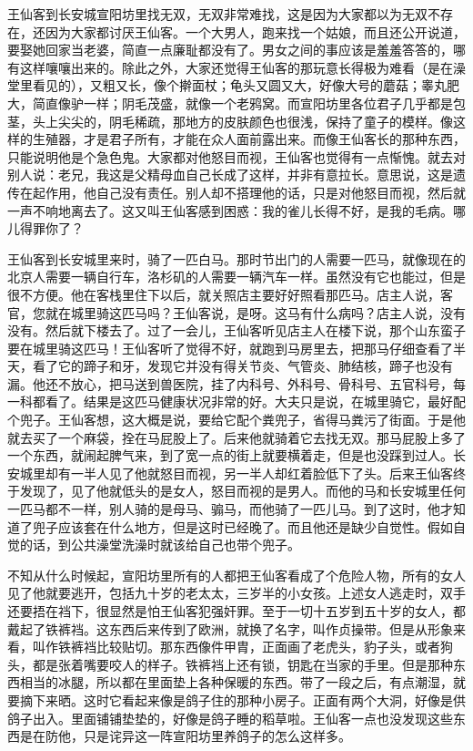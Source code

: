 王仙客到长安城宣阳坊里找无双，无双非常难找，这是因为大家都以为无双不存在，还因为大家都讨厌王仙客。一个大男人，跑来找一个姑娘，而且还公开说道，要娶她回家当老婆，简直一点廉耻都没有了。男女之间的事应该是羞羞答答的，哪有这样嚷嚷出来的。除此之外，大家还觉得王仙客的那玩意长得极为难看（是在澡堂里看见的），又粗又长，像个擀面杖；龟头又圆又大，好像大号的蘑菇；睾丸肥大，简直像驴一样；阴毛茂盛，就像一个老鸦窝。而宣阳坊里各位君子几乎都是包茎，头上尖尖的，阴毛稀疏，那地方的皮肤颜色也很浅，保持了童子的模样。像这样的生殖器，才是君子所有，才能在众人面前露出来。而像王仙客长的那种东西，只能说明他是个急色鬼。大家都对他怒目而视，王仙客也觉得有一点惭愧。就去对别人说：老兄，我这是父精母血自己长成了这样，并非有意拉长。意思说，这是遗传在起作用，他自己没有责任。别人却不搭理他的话，只是对他怒目而视，然后就一声不响地离去了。这又叫王仙客感到困惑：我的雀儿长得不好，是我的毛病。哪儿得罪你了？ 

王仙客到长安城里来时，骑了一匹白马。那时节出门的人需要一匹马，就像现在的北京人需要一辆自行车，洛杉矶的人需要一辆汽车一样。虽然没有它也能过，但是很不方便。他在客栈里住下以后，就关照店主要好好照看那匹马。店主人说，客官，您就在城里骑这匹马吗？王仙客说，是呀。这马有什么病吗？店主人说，没有没有。然后就下楼去了。过了一会儿，王仙客听见店主人在楼下说，那个山东蛮子要在城里骑这匹马！王仙客听了觉得不好，就跑到马房里去，把那马仔细查看了半天，看了它的蹄子和牙，发现它并没有得关节炎、气管炎、肺结核，蹄子也没有漏。他还不放心，把马送到兽医院，挂了内科号、外科号、骨科号、五官科号，每一科都看了。结果是这匹马健康状况非常的好。大夫只是说，在城里骑它，最好配个兜子。王仙客想，这大概是说，要给它配个粪兜子，省得马粪污了街面。于是他就去买了一个麻袋，拴在马屁股上了。后来他就骑着它去找无双。那马屁股上多了一个东西，就闹起脾气来，到了宽一点的街上就要横着走，但是也没踩到过人。长安城里却有一半人见了他就怒目而视，另一半人却红着脸低下了头。后来王仙客终于发现了，见了他就低头的是女人，怒目而视的是男人。而他的马和长安城里任何一匹马都不一样，别人骑的是母马、骟马，而他骑了一匹儿马。到了这时，他才知道了兜子应该套在什么地方，但是这时已经晚了。而且他还是缺少自觉性。假如自觉的话，到公共澡堂洗澡时就该给自己也带个兜子。 

不知从什么时候起，宣阳坊里所有的人都把王仙客看成了个危险人物，所有的女人见了他就要逃开，包括九十岁的老太太，三岁半的小女孩。上述女人逃走时，双手还要捂在裆下，很显然是怕王仙客犯强奸罪。至于一切十五岁到五十岁的女人，都戴起了铁裤裆。这东西后来传到了欧洲，就换了名字，叫作贞操带。但是从形象来看，叫作铁裤裆比较贴切。那东西像件甲胄，正面画了老虎头，豹子头，或者狗头，都是张着嘴要咬人的样子。铁裤裆上还有锁，钥匙在当家的手里。但是那种东西相当的冰腿，所以都在里面垫上各种保暖的东西。带了一段之后，有点潮湿，就要摘下来晒。这时它看起来像是鸽子住的那种小房子。正面有两个大洞，好像是供鸽子出入。里面铺铺垫垫的，好像是鸽子睡的稻草啦。王仙客一点也没发现这些东西是在防他，只是诧异这一阵宣阳坊里养鸽子的怎么这样多。 

